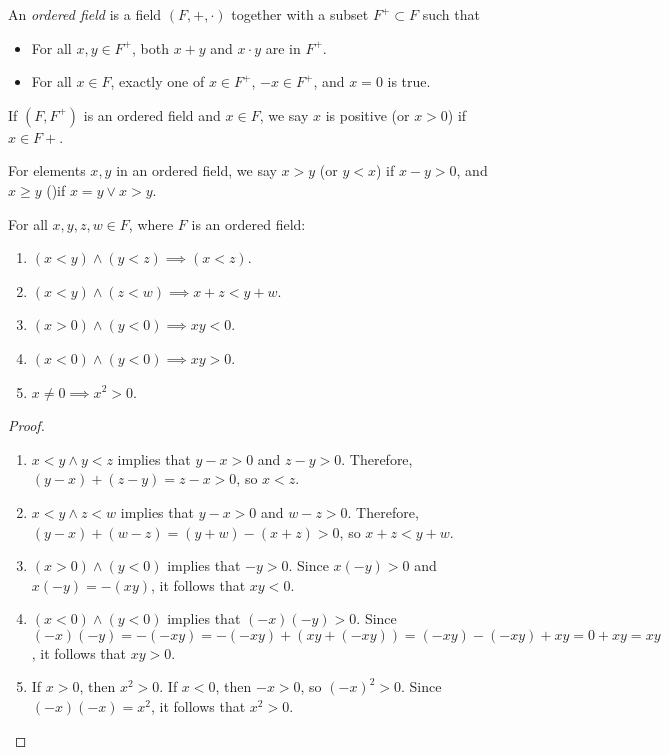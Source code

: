 \documentclass[12pt]{article}
\begin{document}
\begin{defn}
    An \emph{ordered field} is a field $(F, +, \cdot)$ together with a subset $F^+ \subset F$ such that\begin{itemize}
        \item For all $x, y \in F^+$, both $x + y$ and $x \cdot y$ are in $F^+$.
        \item For all $x \in F$, exactly one of $x \in F^+$, $-x \in F^+$, and $x = 0$ is true.
    \end{itemize}
\end{defn}

If $(F, F^+)$ is an ordered field and $x \in F$, we say $x$ is positive (or $x > 0$) if $x \in F+$.

\begin{defn}
    For elements $x, y$ in an ordered field, we say $x > y$ (or $y < x$) if $x - y > 0$, and $x \geq y$  ()if $x = y \lor x > y$.
\end{defn}

\begin{thm} For all $x, y, z, w \in F$, where $F$ is an ordered field:
    \begin{enumerate}
        \item $(x < y) \land (y < z) \implies (x < z)$.
        \item $(x < y) \land (z < w) \implies x + z < y + w$.
        \item $(x > 0) \land (y < 0) \implies xy < 0$.
        \item $(x < 0) \land (y < 0) \implies xy > 0$.
        \item $x \neq 0 \implies x^2 > 0$.
    \end{enumerate}
\end{thm}

\begin{proof}\proofbreak
    \begin{enumerate}
        \item $x < y \land y < z$ implies that $y - x > 0$ and $z - y > 0$. Therefore, $(y - x) + (z - y) = z - x > 0$, so $x < z$.
        \item $x < y \land z < w$ implies that $y - x > 0$ and $w - z > 0$. Therefore, $(y - x) + (w - z) = (y + w) - (x + z) > 0$, so $x + z < y + w$.
        \item $(x > 0) \land (y < 0)$ implies that $-y > 0$. Since $x(-y) > 0$ and $x(-y) = -(xy)$, it follows that $xy < 0$.
        \item $(x < 0) \land (y < 0)$ implies that $(-x)(-y) > 0$. Since $(-x)(-y) = -(-xy) = -(-xy) + (xy  + (-xy)) = (-xy) - (-xy) + xy = 0 + xy = xy$, it follows that $xy > 0$.
        \item If $x > 0$, then $x^2 > 0$. If $x < 0$, then $-x > 0$, so $(-x)^2 > 0$. Since $(-x)(-x) = x^2$, it follows that $x^2 > 0$.
    \end{enumerate}
\end{proof}
\end{document}
